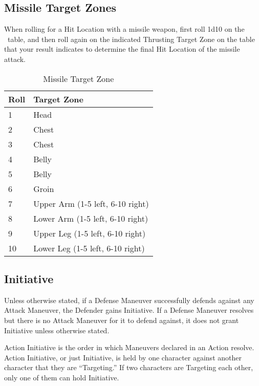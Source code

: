 \documentclass[oneside,11pt,english]{book}
\begin{document}
\subsection{Missile Target Zones}
When rolling for a Hit Location with a missile weapon, first roll 1d10 on the ~table, and then roll again on the indicated Thrusting Target Zone on the  table that your result indicates to determine the final Hit Location of the missile attack.
\begin{table}[!ht]
	\centering
	\caption{Missile Target Zone}
	\label{tab:Missile Target Zones}
	\begin{tabu} spread 0pt {X[-1,c]X[2]}
		Roll&Target Zone\\&Head\\ %
		2&Chest\\
		3&Chest\\
		4&Belly\\
		5&Belly\\
		6&Groin\\
		7&Upper Arm\newline
			(1-5 left, 6-10 right)\\
		8&Lower Arm \newline
			(1-5 left, 6-10 right)\\
		9&Upper Leg \newline
			(1-5 left, 6-10 right)\\
		10&Lower Leg \newline
			(1-5 left, 6-10 right)\\
	\end{tabu}
\end{table}

\subsection{Initiative}
Unless otherwise stated, if a Defense Maneuver successfully defends against any Attack
Maneuver, the Defender gains Initiative. If a Defense Maneuver resolves but there is no Attack
Maneuver for it to defend against, it does not grant Initiative unless otherwise stated.

Action Initiative is the order in which Maneuvers declared in an Action resolve. Action Initiative, or just Initiative, is held by one character against another character that they are
``Targeting.'' If two characters are Targeting each other, only one of them can hold
Initiative.
\end{document}
